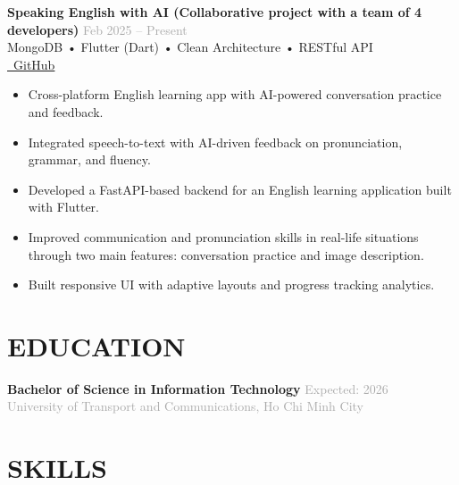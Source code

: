 \documentclass[10pt,a4paper]{article}
\newcommand{\projectitem}[5]{%
    \noindent\begin{tcolorbox}[
        colback=white,
        colframe=lightgray,
        boxrule=0.3pt,
        arc=2pt,
        top=3pt,
        bottom=3pt,
        left=6pt,
        right=6pt
    ]
        \noindent\textbf{\color{primary}#1} \hfill \textcolor{darkgray}{\scriptsize#2}\\[1pt]
        {\small\color{secondary}#3}\\[1pt]
        {\scriptsize\color{darkgray}#4}\\[3pt]
        #5
    \end{tcolorbox}
}
\begin{document}
\vspace{3pt}

\projectitem{Speaking English with AI (Collaborative project with a team of 4 developers)}{Feb 2025 -- Present}
    {MongoDB • Flutter (Dart) • Clean Architecture • RESTful API}
    {\href{https://github.com/dungken/speaking_english_with_ai_app}{\textcolor{secondary}{\faGithub\ GitHub}}}
    {\begin{itemize}[leftmargin=12pt,itemsep=1pt,parsep=0pt,topsep=0pt,after=\vspace{-2pt},label={•}]
        \item Cross-platform English learning app with AI-powered conversation practice and feedback.
        \item Integrated speech-to-text with AI-driven feedback on pronunciation, grammar, and fluency.
        \item Developed a FastAPI-based backend for an English learning application built with Flutter.
        \item Improved communication and pronunciation skills in real-life situations through two main features: conversation practice and image description.
        \item Built responsive UI with adaptive layouts and progress tracking analytics.
    \end{itemize}}

\vspace{6pt}

\section{EDUCATION}
\noindent
\textbf{Bachelor of Science in Information Technology} \hfill \textcolor{darkgray}{\small Expected: 2026} \\[1pt]
\textcolor{darkgray}{\small University of Transport and Communications, Ho Chi Minh City}


\vspace{6pt}

\section{SKILLS}
\end{document}

